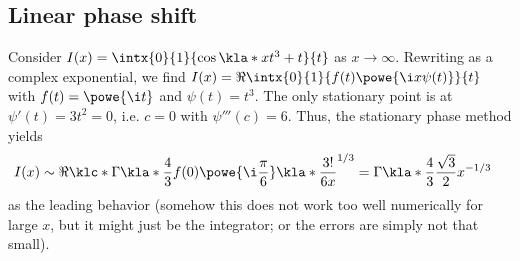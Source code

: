 \documentclass[english, parskip=full]{scrartcl}
\begin{document}
\subsection{Linear phase shift}
Consider $I(x) = \intx{0}{1}{\cos\kla*{xt^3 + t}}{t}$ as $x\rightarrow\infty$.
Rewriting as a complex exponential, we find $I(x) = \Re \intx{0}{1}{f(t) \powe{\i x\psi(t)}}{t}$ with $f(t) = \powe{\i t}$ and $\psi(t) = t^3$.
The only stationary point is at $\psi'(t)=3t^2=0$, i.e. $c=0$ with $\psi'''(c)=6$.
Thus, the stationary phase method yields
\begin{align}
I(x) &\sim \Re \klc*{\Gamma\kla*{\frac{4}{3}} f(0) \powe{\i \frac{\pi}{6}} \kla*{\frac{3!}{6x}}^{1/3}} = \Gamma\kla*{\frac{4}{3}} \frac{\sqrt{3}}{2} x^{-1/3}
\end{align}
as the leading behavior (somehow this does not work too well numerically for large $x$, but it might just be the integrator; or the errors are simply not that small).
\end{document}
